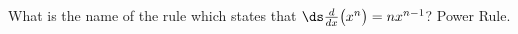 {What is the name of the rule which states that $\ds \frac{d}{dx}\big(x^n\big) = nx^{n-1}$?
}
{Power Rule.
}
